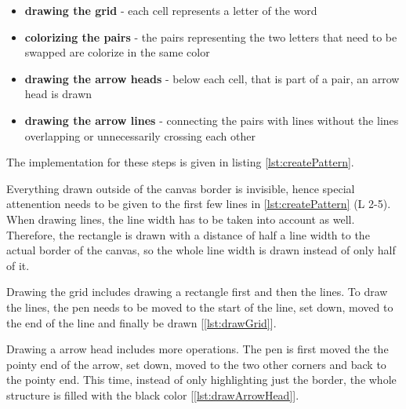 \begin{itemize}
  \item \textbf{drawing the grid} - each cell represents a letter of the word
  \item \textbf{colorizing the pairs} - the pairs representing the two letters that need to be swapped are colorize in the same color
  \item \textbf{drawing the arrow heads} - below each cell, that is part of a pair, an arrow head is drawn
  \item \textbf{drawing the arrow lines} - connecting the pairs with lines without the lines overlapping or unnecessarily crossing each other
\end{itemize}

The implementation for these steps is given in listing \ref{lst:createPattern}.

Everything drawn outside of the canvas border is invisible, hence special attenention needs to be given to the first few lines in \ref{lst:createPattern} (L 2-5). When drawing lines, the line width has to be taken into account as well. Therefore, the rectangle is drawn with a distance of half a line width to the actual border of the canvas, so the whole line width is drawn instead of only half of it. 

Drawing the grid includes drawing a rectangle first and  then the lines. To draw the lines, the pen needs to be moved to the start of the line, set down, moved to the end of the line and finally be drawn [\ref{lst:drawGrid}]. 

Drawing a arrow head includes more operations. The pen is first moved the the pointy end of the arrow, set down, moved to the two other corners and back to the pointy end. This time, instead of only highlighting just the border, the whole structure is filled with the black color [\ref{lst:drawArrowHead}].

